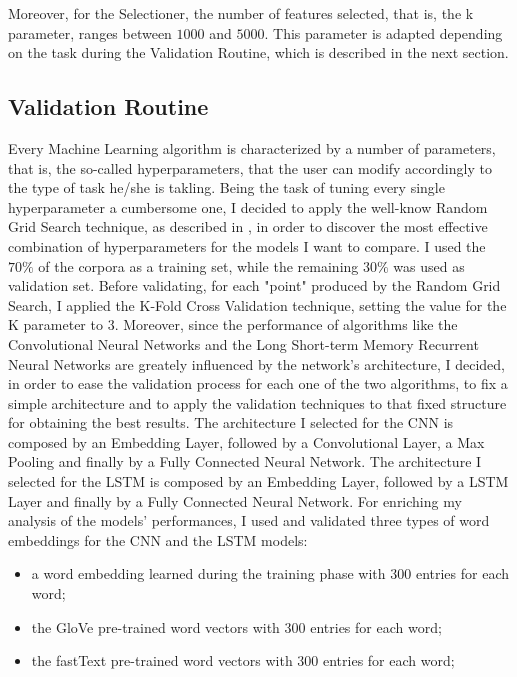 \documentclass[11pt,twocolumn]{article}
\begin{document}
            \noindent
            Moreover, for the Selectioner, the number of features selected, that is, the k parameter,
            ranges between $1000$ and $5000$. This parameter is adapted depending on the task during the
            Validation Routine, which is described in the next section.

        \subsection{Validation Routine} %
        \label{sub:validation_routine}
            Every Machine Learning algorithm is characterized by a number of parameters, that is, the
            so-called hyperparameters, that the user can modify accordingly to the type of task he/she is
            takling. Being the task of tuning every single hyperparameter a cumbersome one, I decided to
            apply the well-know Random Grid Search technique, as described in \cite{random_grid_search}, in
            order to discover the most effective combination of hyperparameters for the models I want to
            compare. I used the $70\%$ of the corpora as a training set, while the remaining $30\%$ was used as
            validation set. Before validating, for each "point" produced by the Random Grid Search, I
            applied the K-Fold Cross Validation technique, setting the value for the K parameter to $3$.
            Moreover, since the performance of algorithms like the Convolutional Neural Networks and the
            Long Short-term Memory Recurrent Neural Networks are greately influenced by the network's
            architecture, I decided, in order to ease the validation process for each one of the two
            algorithms, to fix a simple architecture and to apply the validation techniques to that fixed
            structure for obtaining the best results. The architecture I selected for the CNN is composed
            by an Embedding Layer, followed by a Convolutional Layer, a Max Pooling and finally by a Fully
            Connected Neural Network. The architecture I selected for the LSTM is composed by an Embedding
            Layer, followed by a LSTM Layer and finally by a Fully Connected Neural Network. For enriching
            my analysis of the models' performances, I used and validated three types of word embeddings
            for the CNN and the LSTM models:

            \begin{itemize}
                \item a word embedding learned during the training phase with $300$ entries for each word;
                \item the GloVe \cite{glove} pre-trained word vectors with $300$ entries for each word;
                \item the fastText \cite{fasttext} pre-trained word vectors with $300$ entries for each
                word;
            \end{itemize}
\end{document}
